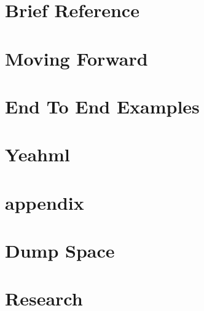 \documentclass[12pt]{book}
\begin{document}
\part{Brief Reference}







\part{Moving Forward}



\part{End To End Examples}



\part{Yeahml}




\part{appendix}




\part{Dump Space}






\part{Research}





\backmatter 


\printindex



%
%
%


{\footnotesize
	}
%
\end{document}
